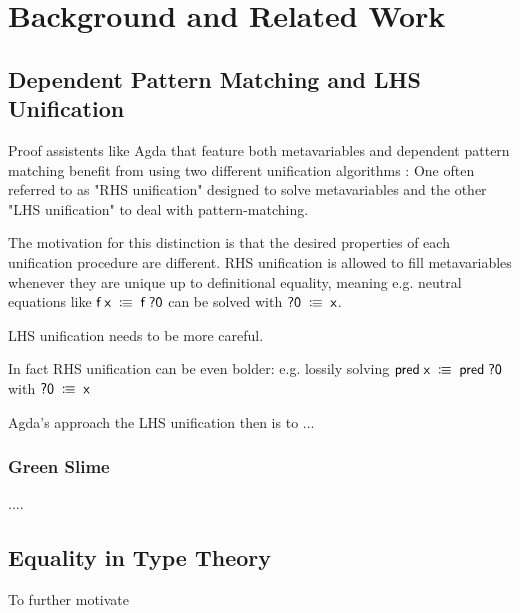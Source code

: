\documentclass[
    a4paper, %
    fontsize=9.5pt, %
    twoside=false, %
	numbers=noenddot, %
	fontmethod=tex, %
]{kaobook}
\newcommand{\Varid}[1]{\mathit{#1}}
\renewcommand\Varid[1]{\mathord{\textsf{#1}}}
\begin{document}
\setchapterpreamble[u]{\margintoc}

\chapter{Background and Related Work}

\section{Dependent Pattern Matching and LHS Unification}

Proof assistents like Agda that feature both metavariables and dependent pattern
matching benefit from using two different unification algorithms 
: One often referred to as "RHS unification" 
designed to solve metavariables and the other "LHS unification" to deal with
pattern-matching.

The motivation for this distinction is that the desired properties of each
unification procedure are different. RHS unification is allowed to fill
metavariables whenever they are unique up to definitional equality, meaning
e.g. neutral equations like \ensuremath{\Varid{f}\;\Varid{x}\;\colonequiv\;\Varid{f}\;\Varid{?0}} can be solved with \ensuremath{\Varid{?0}\;\colonequiv\;\Varid{x}}.

LHS unification needs to be more careful.

In fact RHS unification can be even bolder: e.g. lossily solving 
\ensuremath{\Varid{pred}\;\Varid{x}\;\colonequiv\;\Varid{pred}\;\Varid{?0}} with \ensuremath{\Varid{?0}\;\colonequiv\;\Varid{x}}

Agda's approach the LHS unification then is to ...

\subsection{Green Slime}

....



\section{Equality in Type Theory}





To further motivate
\end{document}
